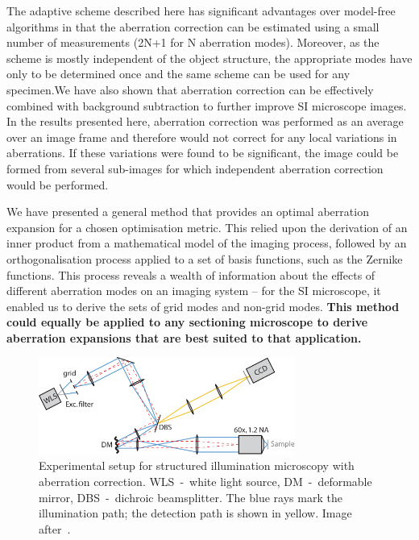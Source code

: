 The adaptive scheme described here has significant advantages over model-free algorithms in that the aberration correction can be estimated using a small number of measurements (2N+1 for N aberration modes). Moreover, as the scheme is mostly independent of the object structure, the appropriate modes have only to be determined once and the same scheme can be used for any specimen.We have also shown that aberration correction can be effectively combined with background subtraction to further improve SI microscope images. In the results presented here, aberration correction was performed as an average over an image frame and therefore would not correct for any local variations in aberrations. If these variations were found to be significant, the image could be formed from several sub-images for which independent aberration correction would be performed.

We have presented a general method that provides an optimal aberration expansion for a chosen optimisation metric. This relied upon the derivation of an inner product from a mathematical model of the imaging process, followed by an orthogonalisation process applied to a set of basis functions, such as the Zernike functions. This process reveals a wealth of information about the effects of different aberration modes on an imaging system – for the SI microscope, it enabled us to derive the sets of grid modes and non-grid modes. \textbf{This method could equally be applied to any sectioning microscope to derive aberration expansions that are best suited to that application.
}
\begin{figure}
	\centering
		\includegraphics[width=0.75\textwidth]{images/wide_structured_illumination.pdf}
	\caption{Experimental setup for structured illumination microscopy with aberration correction. WLS~-~white light source, DM~-~deformable mirror, DBS~-~dichroic beamsplitter. The blue rays mark the illumination path; the detection path is shown in yellow. Image after~\cite{wide_AOM_structured_illu}.}
	\label{fig:wide_structured_illumination}
\end{figure}

